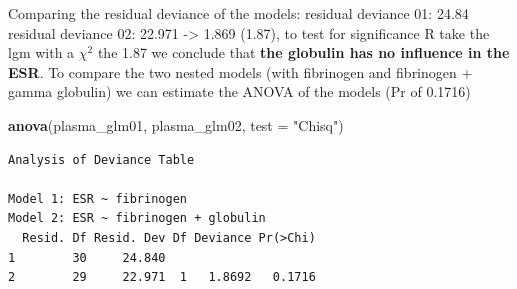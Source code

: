 \documentclass[
]{article}
\newenvironment{Shaded}{\begin{snugshade}}{\end{snugshade}}
\newcommand{\CommentTok}[1]{\textcolor[rgb]{0.56,0.35,0.01}{\textit{#1}}}
\newcommand{\DataTypeTok}[1]{\textcolor[rgb]{0.13,0.29,0.53}{#1}}
\newcommand{\DecValTok}[1]{\textcolor[rgb]{0.00,0.00,0.81}{#1}}
\newcommand{\KeywordTok}[1]{\textcolor[rgb]{0.13,0.29,0.53}{\textbf{#1}}}
\newcommand{\NormalTok}[1]{#1}
\newcommand{\OperatorTok}[1]{\textcolor[rgb]{0.81,0.36,0.00}{\textbf{#1}}}
\newcommand{\OtherTok}[1]{\textcolor[rgb]{0.56,0.35,0.01}{#1}}
\newcommand{\StringTok}[1]{\textcolor[rgb]{0.31,0.60,0.02}{#1}}
\begin{document}
Comparing the residual deviance of the models: residual deviance 01:
24.84 residual deviance 02: 22.971 -\textgreater{} 1.869 (1.87), to test
for significance R take the lgm with a \(\chi^2\) the 1.87 we conclude
that \textbf{the globulin has no influence in the ESR}. To compare the
two nested models (with fibrinogen and fibrinogen + gamma globulin) we
can estimate the ANOVA of the models (Pr of 0.1716)

\begin{Shaded}
\begin{Highlighting}[]
\KeywordTok{anova}\NormalTok{(plasma_glm01, plasma_glm02, }\DataTypeTok{test =} \StringTok{"Chisq"}\NormalTok{)}
\end{Highlighting}
\end{Shaded}

\begin{verbatim}
Analysis of Deviance Table

Model 1: ESR ~ fibrinogen
Model 2: ESR ~ fibrinogen + globulin
  Resid. Df Resid. Dev Df Deviance Pr(>Chi)
1        30     24.840                     
2        29     22.971  1   1.8692   0.1716
\end{verbatim}

\begin{Shaded}
\end{Shaded}
\end{document}
